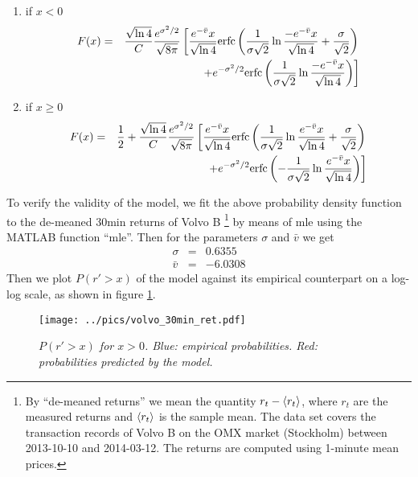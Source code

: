 \begin{enumerate}
\item if $x < 0$
  \begin{eqnarray*}
    F(x) &=& {\sqrt{\ln 4} \over C}{e^{\sigma^2 / 2} \over \sqrt{8\pi}}
    \left[
      {e^{-\bar{v}}x \over \sqrt{\ln 4}}\text{erfc}\left(
        {1 \over \sigma \sqrt 2} \ln{-e^{-\bar{v}}x \over \sqrt{\ln
            4}} + {\sigma \over \sqrt 2}
      \right) \right.\\
      && \left. + e^{-\sigma^2 / 2} \text{erfc}\left(
        {1 \over \sigma \sqrt 2} \ln{-e^{-\bar{v}}x \over \sqrt{\ln 4}}
      \right)
    \right]
  \end{eqnarray*}
\item if $x \geq 0$
  \begin{eqnarray*}
    F(x) &=& \frac{1}{2} + {\sqrt{\ln 4} \over C}{e^{\sigma^2 / 2} \over
      \sqrt{8\pi}} \left[
      {e^{-\bar{v}}x \over \sqrt{\ln 4}} \text{erfc}\left(
        {1 \over \sigma \sqrt 2} \ln{e^{-\bar{v}}x \over \sqrt{\ln
            4}} + {\sigma \over \sqrt 2}
      \right) \right. \\
      && \left. + e^{-\sigma^2/2} \text{erfc}\left(
        -{1 \over \sigma \sqrt 2} \ln{e^{-\bar{v}}x \over \sqrt{\ln 4}}
      \right)
    \right]
  \end{eqnarray*}
\end{enumerate}

To verify the validity of the model, we fit the above probability
density function to the de-meaned 30min returns of Volvo B
\footnote{By ``de-meaned returns'' we mean the quantity $r_t - 
  \langle r_t\rangle$, where $r_t$ are the measured returns and $\langle r_t\rangle$
  is the sample mean. The data set covers the transaction records of
  Volvo B on the OMX market (Stockholm) between 2013-10-10 and
  2014-03-12. The returns are computed using 1-minute mean prices.}
by means of \gls{mle} using the MATLAB function ``mle''. Then for the
parameters $\sigma$ and $\bar{v}$ we get
\begin{eqnarray*}
  \sigma &=& 0.6355 \\
  \bar{v} &=& -6.0308
\end{eqnarray*}
Then we plot $P(r' > x)$ of the model against its empirical
counterpart on a log-log scale, as shown in figure
\ref{fig:volvo_30min_ret}.
\begin{figure}[htb!]
  \begin{center}
    \texttt{[image: ../pics/volvo\_30min\_ret.pdf]}
  \end{center}
  \caption{\small \it{$P(r' > x)$ for $x > 0$. Blue: empirical
      probabilities. Red: probabilities predicted by the model.}}
  \label{fig:volvo_30min_ret}
\end{figure}


